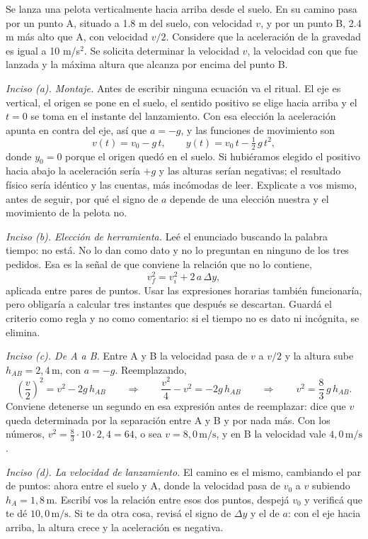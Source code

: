\documentclass[11pt,openany]{book}
\begin{document}
\begin{ejemplo}[completo]
Se lanza una pelota verticalmente hacia arriba desde el suelo. En su camino pasa por un punto A, situado a 1.8 m del suelo, con velocidad $v$, y por un punto B, 2.4 m más alto que A, con velocidad $v/2$. Considere que la aceleración de la gravedad es igual a 10 m/s$^2$. Se solicita determinar la velocidad $v$, la velocidad con que fue lanzada y la máxima altura que alcanza por encima del punto B.

\medskip
\textit{Inciso (a). Montaje.} Antes de escribir ninguna ecuación va el ritual. El eje es vertical, el origen se pone en el suelo, el sentido positivo se elige hacia arriba y el $t=0$ se toma en el instante del lanzamiento. Con esa elección la aceleración apunta en contra del eje, así que $a=-g$, y las funciones de movimiento son
\[
v(t) = v_0 - g\,t, \qquad y(t) = v_0\,t - \tfrac12\,g\,t^2,
\]
donde $y_0=0$ porque el origen quedó en el suelo. Si hubiéramos elegido el positivo hacia abajo la aceleración sería $+g$ y las alturas serían negativas; el resultado físico sería idéntico y las cuentas, más incómodas de leer. Explicate a vos mismo, antes de seguir, por qué el signo de $a$ depende de una elección nuestra y el movimiento de la pelota no.

\medskip
\textit{Inciso (b). Elección de herramienta.} Leé el enunciado buscando la palabra tiempo: no está. No lo dan como dato y no lo preguntan en ninguno de los tres pedidos. Esa es la señal de que conviene la relación que no lo contiene,
\[
v_f^2 = v_i^2 + 2\,a\,\Delta y,
\]
aplicada entre pares de puntos. Usar las expresiones horarias también funcionaría, pero obligaría a calcular tres instantes que después se descartan. Guardá el criterio como regla y no como comentario: si el tiempo no es dato ni incógnita, se elimina.

\medskip
\textit{Inciso (c). De A a B.} Entre A y B la velocidad pasa de $v$ a $v/2$ y la altura sube $h_{AB}=2{,}4\,\mathrm{m}$, con $a=-g$. Reemplazando,
\[
\left(\frac{v}{2}\right)^{2} = v^{2} - 2g\,h_{AB}
\qquad\Longrightarrow\qquad
\frac{v^2}{4} - v^2 = -2g\,h_{AB}
\qquad\Longrightarrow\qquad
v^{2} = \frac{8}{3}\,g\,h_{AB}.
\]
Conviene detenerse un segundo en esa expresión antes de reemplazar: dice que $v$ queda determinada por la separación entre A y B y por nada más. Con los números, $v^2 = \tfrac83\cdot 10\cdot 2{,}4 = 64$, o sea $v = 8{,}0\,\mathrm{m/s}$, y en B la velocidad vale $4{,}0\,\mathrm{m/s}$.

\medskip
\textit{Inciso (d). La velocidad de lanzamiento.} El camino es el mismo, cambiando el par de puntos: ahora entre el suelo y A, donde la velocidad pasa de $v_0$ a $v$ subiendo $h_A = 1{,}8\,\mathrm{m}$. Escribí vos la relación entre esos dos puntos, despejá $v_0$ y verificá que te dé $10{,}0\,\mathrm{m/s}$. Si te da otra cosa, revisá el signo de $\Delta y$ y el de $a$: con el eje hacia arriba, la altura crece y la aceleración es negativa.


\end{ejemplo}
\end{document}
